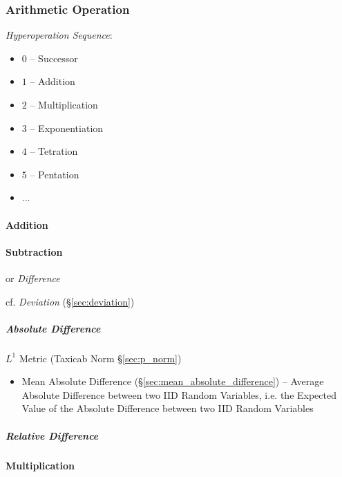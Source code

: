 \subsubsection{Arithmetic Operation}\label{sec:arithmetic_operation}

\emph{Hyperoperation Sequence}:
\begin{itemize}
  \item $0$ -- Successor
  \item $1$ -- Addition
  \item $2$ -- Multiplication
  \item $3$ -- Exponentiation
  \item $4$ -- Tetration
  \item $5$ -- Pentation
  \item ...
\end{itemize}



\paragraph{Addition}\label{sec:addition}\hfill

\paragraph{Subtraction}\label{sec:subtraction}\hfill

or \emph{Difference}

cf. \emph{Deviation} (\S\ref{sec:deviation})



\subparagraph{Absolute Difference}\label{sec:absolute_difference}\hfill


$L^1$ Metric (Taxicab Norm \S\ref{sec:p_norm})

\begin{itemize}
  \item Mean Absolute Difference (\S\ref{sec:mean_absolute_difference}) --
    Average Absolute Difference between two IID Random Variables, i.e. the
    Expected Value of the Absolute Difference between two IID Random Variables
\end{itemize}



\subparagraph{Relative Difference}\label{sec:relative_difference}\hfill




\paragraph{Multiplication}\label{sec:addition}\hfill

